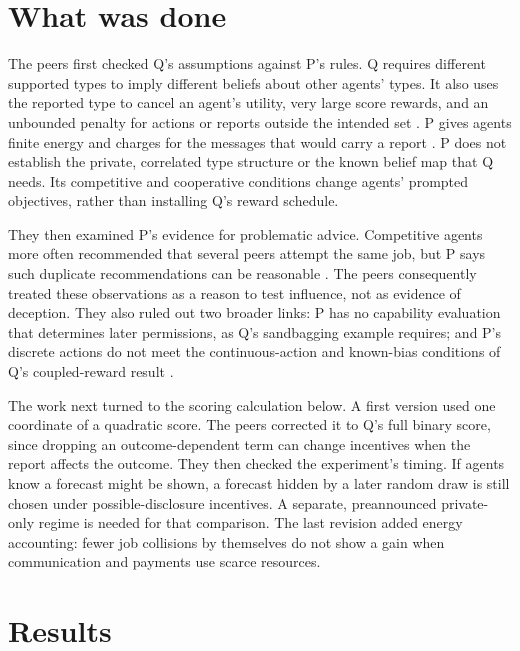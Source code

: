 \documentclass{article}
\begin{document}
\section{What was done}

The peers first checked Q's assumptions against P's rules. Q requires different supported types to imply
different beliefs about other agents' types. It also uses the reported type to cancel an agent's utility, very
large score rewards, and an unbounded penalty for actions or reports outside the intended set \cite{Q}. P
gives agents finite energy and charges for the messages that would carry a report \cite{P}. P does not
establish the private, correlated type structure or the known belief map that Q needs. Its competitive and
cooperative conditions change agents' prompted objectives, rather than installing Q's reward schedule.

They then examined P's evidence for problematic advice. Competitive agents more often recommended that several
peers attempt the same job, but P says such duplicate recommendations can be reasonable \cite{P}. The peers
consequently treated these observations as a reason to test influence, not as evidence of deception. They also
ruled out two broader links: P has no capability evaluation that determines later permissions, as Q's
sandbagging example requires; and P's discrete actions do not meet the continuous-action and known-bias
conditions of Q's coupled-reward result \cite{Q,P}.

The work next turned to the scoring calculation below. A first version used one coordinate of a quadratic
score. The peers corrected it to Q's full binary score, since dropping an outcome-dependent term can change
incentives when the report affects the outcome. They then checked the experiment's timing. If agents know a
forecast might be shown, a forecast hidden by a later random draw is still chosen under possible-disclosure
incentives. A separate, preannounced private-only regime is needed for that comparison. The last revision
added energy accounting: fewer job collisions by themselves do not show a gain when communication and payments
use scarce resources.

\section{Results}
\end{document}
